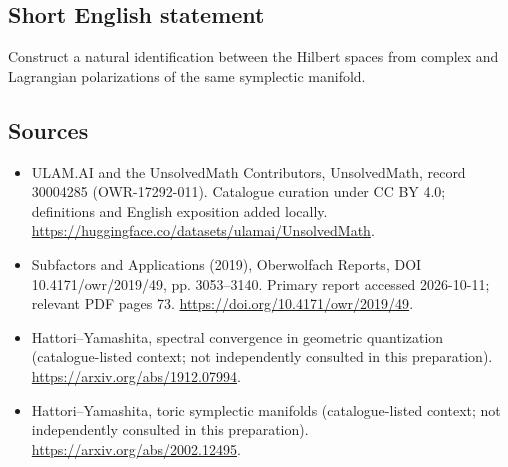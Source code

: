 \documentclass[11pt]{article}
\begin{document}
\subsection{Short English statement}
Construct a natural identification between the Hilbert spaces from complex and Lagrangian polarizations of the same symplectic manifold.
\subsection{Sources}
\begin{itemize}
\item[\hypertarget{source:30004285:1}{S1}] ULAM.AI and the UnsolvedMath Contributors, UnsolvedMath, record 30004285 (OWR-17292-011). Catalogue curation under CC BY 4.0; definitions and English exposition added locally.
\url{https://huggingface.co/datasets/ulamai/UnsolvedMath}.
\item[\hypertarget{source:30004285:2}{S2}] Subfactors and Applications (2019), Oberwolfach Reports, DOI 10.4171/owr/2019/49, pp. 3053--3140. Primary report accessed 2026-10-11; relevant PDF pages 73.
\url{https://doi.org/10.4171/owr/2019/49}.
\item[\hypertarget{source:30004285:3}{S3}] Hattori--Yamashita, spectral convergence in geometric quantization (catalogue-listed context; not independently consulted in this preparation).
\url{https://arxiv.org/abs/1912.07994}.
\item[\hypertarget{source:30004285:4}{S4}] Hattori--Yamashita, toric symplectic manifolds (catalogue-listed context; not independently consulted in this preparation).
\url{https://arxiv.org/abs/2002.12495}.
\end{itemize}
\label{end:30004285}
\end{document}
